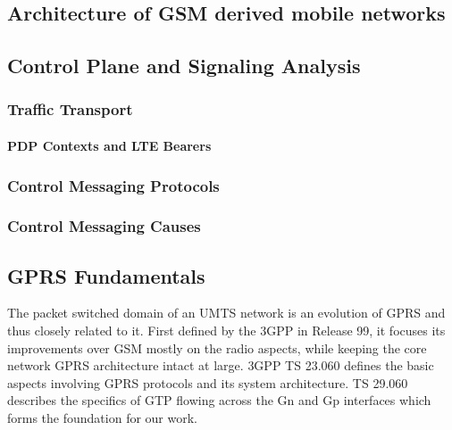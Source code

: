 %
%
\subsection{Architecture of GSM derived mobile networks}
\label{sec:3gpparchitecture}


\subsection{Control Plane and Signaling Analysis}
\subsubsection{Traffic Transport}
\paragraph{PDP Contexts and LTE Bearers}
\subsubsection{Control Messaging Protocols}
\subsubsection{Control Messaging Causes}



\subsection{\acs{GPRS} Fundamentals}

The packet switched domain of an \ac{UMTS} network is an evolution of \ac{GPRS} and thus closely related to it. First defined by the \ac{3GPP} in Release 99, it focuses its improvements over \ac{GSM} mostly on the radio aspects, while keeping the core network \ac{GPRS} architecture intact at large. \ac{3GPP} \ac{TS} 23.060 \cite{3gpp23.060} defines the basic aspects involving \ac{GPRS} protocols and its system architecture. \ac{TS} 29.060 \cite{3gpp29.060} describes the specifics of \ac{GTP} flowing across the Gn and Gp interfaces which forms the foundation for our work.

